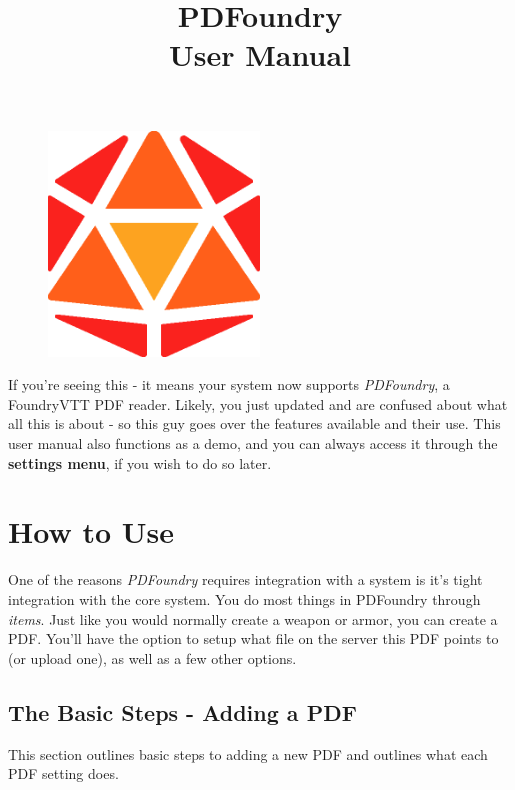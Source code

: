 \documentclass{article}
\title{%
    PDFoundry \\
    \large User Manual}
\date{}
\author{}
\begin{document}
    \begin{figure}[t]
        \centering
        \includegraphics[width=0.5\textwidth]{images/logo.png}
    \end{figure}
    \maketitle

    If you're seeing this - it means your system now supports \textit{PDFoundry}, a FoundryVTT PDF reader. Likely, you just updated and are confused about what all this is about - so this guy goes over the features available and their use. This user manual also functions as a demo, and you can always access it through the \textbf{settings menu}, if you wish to do so later.

    \tableofcontents

    \section{How to Use}
    One of the reasons \textit{PDFoundry} requires integration with a system is it's tight integration with the core system. You do most things in PDFoundry through \textit{items}. Just like you would normally create a weapon or armor, you can create a PDF. You'll have the option to setup what file on the server this PDF points to (or upload one), as well as a few other options.

    \subsection{The Basic Steps - Adding a PDF}
    This section outlines basic steps to adding a new PDF and outlines what each PDF setting does.
\end{document}
